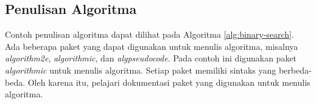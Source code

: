\subsection{Penulisan Algoritma}
Contoh penulisan algoritma dapat dilihat pada Algoritma \ref{alg:binary-search}. Ada beberapa paket yang dapat digunakan untuk menulis algoritma,
misalnya \textit{algorithm2e}, \textit{algorithmic}, dan \textit{algpseudocode}. 
Pada contoh ini digunakan paket \textit{algorithmic} untuk menulis algoritma. Setiap paket memiliki sintaks yang berbeda-beda.
Oleh karena itu, pelajari dokumentasi paket yang digunakan untuk menulis algoritma.





